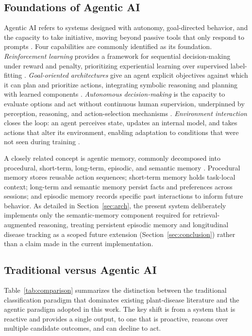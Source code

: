 \documentclass[conference]{IEEEtran}
\begin{document}
\subsection{Foundations of Agentic AI}
Agentic AI refers to systems designed with autonomy, goal-directed behavior, and the capacity to take initiative, moving beyond passive tools that only respond to prompts \cite{b1,b9}. Four capabilities are commonly identified as its foundation. \emph{Reinforcement learning} provides a framework for sequential decision-making under reward and penalty, prioritizing experiential learning over supervised label-fitting \cite{r1}. \emph{Goal-oriented architectures} give an agent explicit objectives against which it can plan and prioritize actions, integrating symbolic reasoning and planning with learned components \cite{r2,b11}. \emph{Autonomous decision-making} is the capacity to evaluate options and act without continuous human supervision, underpinned by perception, reasoning, and action-selection mechanisms \cite{b12}. \emph{Environment interaction} closes the loop: an agent perceives state, updates an internal model, and takes actions that alter its environment, enabling adaptation to conditions that were not seen during training \cite{b4}.

A closely related concept is agentic memory, commonly decomposed into procedural, short-term, long-term, episodic, and semantic memory \cite{b1}. Procedural memory stores reusable action sequences; short-term memory holds task-local context; long-term and semantic memory persist facts and preferences across sessions; and episodic memory records specific past interactions to inform future behavior. As detailed in Section~\ref{sec:arch}, the present system deliberately implements only the semantic-memory component required for retrieval-augmented reasoning, treating persistent episodic memory and longitudinal disease tracking as a scoped future extension (Section~\ref{sec:conclusion}) rather than a claim made in the current implementation.

\subsection{Traditional versus Agentic AI}
Table~\ref{tab:comparison} summarizes the distinction between the traditional classification paradigm that dominates existing plant-disease literature and the agentic paradigm adopted in this work. The key shift is from a system that is reactive and provides a single output, to one that is proactive, reasons over multiple candidate outcomes, and can decline to act.
\end{document}
